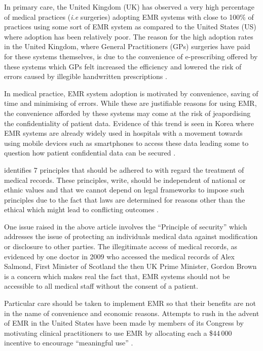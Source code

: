 \documentclass[british,a4paper, 12pt]{article}
\begin{document}
In primary care, the United Kingdom (UK) has observed a very high percentage
of medical practices (\emph{i.e} surgeries) adopting EMR systems with close to 100\% of practices using some sort
of EMR system as compared to the United States (US) where adoption has been relatively poor.
The reason for the high adoption rates in the United Kingdom, where General Practitioners (GPs)
surgeries have paid for these systems themselves, is due to the convenience of e-prescribing
offered by these systems which GPs felt increased the efficiency and lowered the risk of
errors caused by illegible handwritten prescriptions \parencite{schade2006prescribing}.

In medical practice, EMR system adoption is motivated by convenience, saving of time and 
minimising of errors. While these are justifiable reasons for using EMR, the convenience 
afforded by these systems may come at the risk of jeapordising the confidentiality of 
patient data. Evidence of this trend is seen in Korea where EMR systems are already widely 
used in hospitals with a movement towards using mobile devices such as smartphones to 
access these data leading some to question how patient confidential data can be secured
\parencite{yeo2012pitfalls}.

\citeauthor*{kluge2000professional} identifies 7 principles that should be adhered to
with regard the treatment of medical records. These principles,
\citeauthor*{kluge2000professional} write, should be independent of national or ethnic
values and that we cannot depend on legal frameworks to impose such principles due to
the fact that laws are determined for reasons other than the ethical which might lead to
conflicting outcomes \parencite{kluge2000professional}.

One issue raised in the above article involves the ``Principle of security'' which
addresses the issue of protecting an individuals medical data against modification or
disclosure to other parties. The illegitimate access of medical records,
as evidenced by one doctor in 2009 who accessed the medical records of Alex Salmond,
First Minister of Scotland the then UK Prime Minister, Gordon Brown
\parencite{dailyrecord2010doctor} is a concern which makes real the fact that, EMR
systems should not be accessible to all medical staff without the consent of a patient.

Particular care should be taken to implement EMR so that their benefits are not in the
name of convenience and economic reasons. Attempts to rush in the advent of EMR in the
United States have been made by members of its Congress by motivating clinical 
practitioners to use EMR  by allocating each a \$44\,000 incentive to encourage ``meaningful use''
\parencite{jha2010meaningful}.
\end{document}
